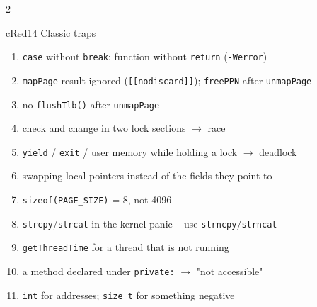 \documentclass[10pt,a4paper,landscape]{article}
\newcommand{\cc}[1]{\texttt{#1}}   %
\begin{document}
\begin{multicols}{2}
\begin{csec}{cRed}{14 \quad Classic traps}
\begin{enumerate}[label=\textbf{\arabic*}, leftmargin=1.3em]
  \item \cc{case} without \cc{break}; function without \cc{return} (\cc{-Werror})
  \item \cc{mapPage} result ignored (\cc{[[nodiscard]]}); \cc{freePPN} after \cc{unmapPage}
  \item no \cc{flushTlb()} after \cc{unmapPage}
  \item check and change in two lock sections $\to$ race
  \item \cc{yield} / \cc{exit} / user memory while holding a lock $\to$ deadlock
  \item swapping local pointers instead of the fields they point to
  \item \cc{sizeof(PAGE\_SIZE)} = 8, not 4096
  \item \cc{strcpy}/\cc{strcat} in the kernel panic -- use \cc{strncpy}/\cc{strncat}
  \item \cc{getThreadTime} for a thread that is not running
  \item a method declared under \cc{private:} $\to$ "not accessible"
  \item \cc{int} for addresses; \cc{size\_t} for something negative
\end{enumerate}
\end{csec}

\end{multicols}
\end{document}
